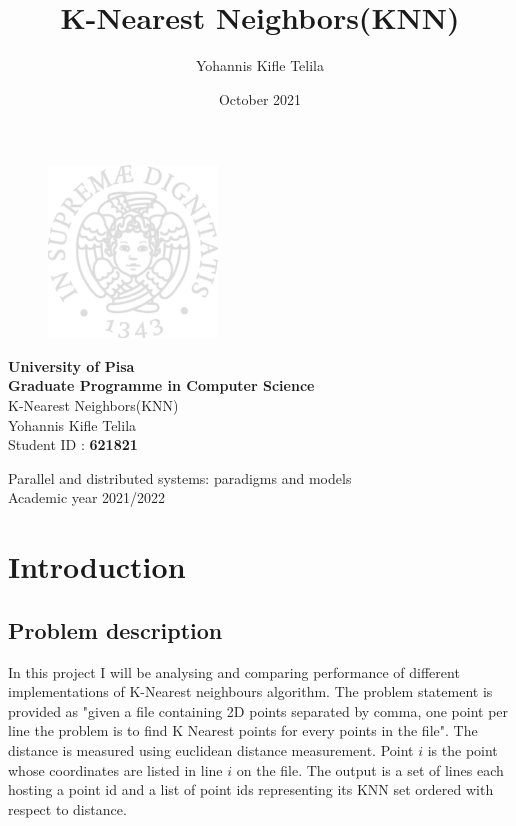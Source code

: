 \documentclass[12pt,a4paper]{report}
\title{K-Nearest Neighbors(KNN)}
\author{Yohannis Kifle Telila}
\date{October 2021}
\begin{document}
\begin{titlepage}
\begin{figure}[t]
    \centering\includegraphics[width=0.4\textwidth]{images/cherubino.eps}
\end{figure}

\begin{center}
    \textbf{University of Pisa\\Graduate Programme in Computer Science}
    \vspace{15mm}
    \\
    {\huge{K-Nearest Neighbors(KNN)}}\\
    \vspace{5mm}
    \large{Yohannis Kifle Telila} \\
    \vspace{2mm}
    \large{Student ID : \textbf{621821} }
\end{center}

\vspace{20mm}
\begin{center}
    {\large Parallel and distributed systems: paradigms and models\\Academic year 2021/2022}
\end{center}
\vspace{36mm}
\end{titlepage}

\tableofcontents
\pagebreak

\chapter{Introduction}
\section{Problem description}
In this project I will be analysing and comparing performance of  different implementations of K-Nearest neighbours algorithm. The problem statement is provided as "given a file containing 2D points separated by comma, one point per line the problem is to find K Nearest points for every points in the file". The distance is measured using euclidean distance measurement. Point $i$ is the point whose coordinates are listed in line $i$ on the file. The output is a set of lines each hosting a point id and a list of point ids representing its KNN set ordered with respect to distance. \\ 
\end{document}
